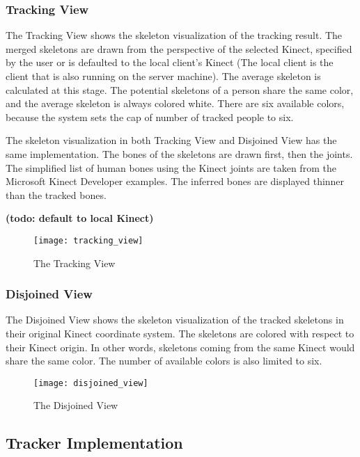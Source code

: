 \subsubsection{Tracking View}
\label{subsec:tracking_view}

The Tracking View shows the skeleton visualization of the tracking result. The merged skeletons are drawn from the perspective of the selected Kinect, specified by the user or is defaulted to the local client's Kinect (The local client is the client that is also running on the server machine). The average skeleton is calculated at this stage. The potential skeletons of a person share the same color, and the average skeleton is always colored white. There are six available colors, because the system sets the cap of number of tracked people to six.

The skeleton visualization in both Tracking View and Disjoined View has the same implementation. The bones of the skeletons are drawn first, then the joints. The simplified list of human bones using the Kinect joints are taken from the Microsoft Kinect Developer examples. The inferred bones are displayed thinner than the tracked bones.

\textbf{(todo: default to local Kinect)}

\begin{figure}[!htb]
  \centering
  \texttt{[image: tracking\_view]}
  \caption{The Tracking View}
  \label{fig:tracking_view}
\end{figure}

\subsubsection{Disjoined View}
\label{subsec:disjoined_view}

The Disjoined View shows the skeleton visualization of the tracked skeletons in their original Kinect coordinate system. The skeletons are colored with respect to their Kinect origin. In other words, skeletons coming from the same Kinect would share the same color. The number of available colors is also limited to six.

\begin{figure}[!htb]
  \centering
  \texttt{[image: disjoined\_view]}
  \caption{The Disjoined View}
  \label{fig:disjoined_view}
\end{figure}

\subsection{Tracker Implementation}

